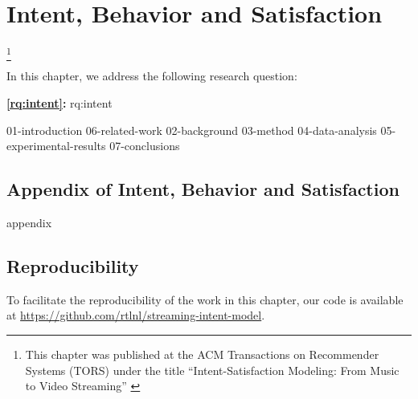 
\chapter{Intent, Behavior and Satisfaction}
\label{chapter:research-intent}

\footnote[]{This chapter was published at the ACM Transactions on Recommender Systems (TORS) under the title ``Intent-Satisfaction Modeling: From Music to Video Streaming'' \citep{intent}}
\acresetall


In this chapter, we address the following research question:

\medskip
\noindent
\textbf{\ref{rq:intent}:} \acl{rq:intent}
\medskip

\noindent

{01-introduction}
{06-related-work}
{02-background}
{03-method}
{04-data-analysis}
{05-experimental-results}
{07-conclusions}


% 
% 
% 
% 
% 
% 
% 


\begin{appendices}
\chapter{Appendix of Intent, Behavior and Satisfaction}
{appendix}
\end{appendices}




\section*{Reproducibility}
To facilitate the reproducibility of the work in this chapter, our code is available at \url{https://github.com/rtlnl/streaming-intent-model}.